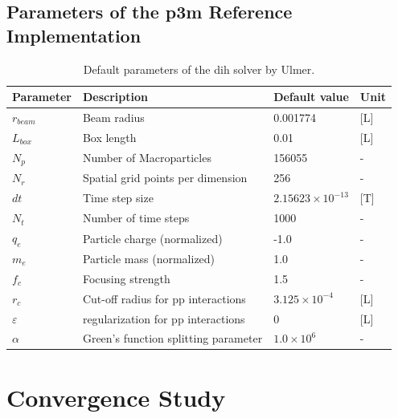\section{Parameters of the \gls{p3m} Reference Implementation}
\label{appendix:ulmerParams}

\begin{table}[h]
    \caption{Default parameters of the \gls{dih} solver by Ulmer.}
    \label{table:UlmerDefaultParams}
    \begin{center}
        \begin{tabular}[c]{llll}
            \toprule
            \multicolumn{1}{l}{\textbf{Parameter}} & 
            \multicolumn{1}{l}{\textbf{Description}} & 
            \multicolumn{1}{l}{\textbf{Default value}} &
            \multicolumn{1}{l}{\textbf{Unit}} \\
            \hline
            $r_{beam}$ & Beam radius & 0.001774  & [L] \\
            $L_{box}$ & Box length & 0.01 & [L] \\
            $N_p$ & Number of Macroparticles & 156055 & - \\
            $N_r$ & Spatial grid points per dimension & 256 & - \\
            $dt$ & Time step size & $2.15623\times10^{-13}$ & [T] \\
            $N_t$ & Number of time steps & 1000 & - \\
            $q_e$ & Particle charge (normalized) & -1.0 & - \\
            $m_e$ & Particle mass (normalized) & 1.0 & - \\
            $f_c$ & Focusing strength & 1.5 & - \\
            $r_c$ & Cut-off radius for \gls{pp} interactions & $3.125\times10^{-4}$ & [L] \\
            $\varepsilon$ & regularization for \gls{pp} interactions & 0 & [L] \\
            $\alpha$ & Green's function splitting parameter & $1.0\times10^6$ & - \\
            \hline
        \end{tabular}
    \end{center}
\end{table}


\clearpage
\chapter{Convergence Study}
\label{appendix:convergenceStudy}

